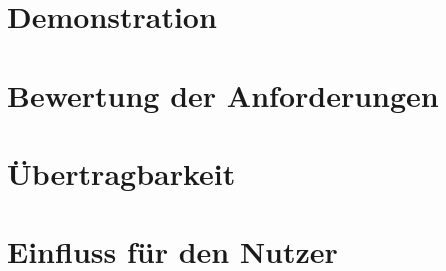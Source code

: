 
\section{Demonstration}
\label{sec:demonstration}


\section{Bewertung der Anforderungen}
\label{sec:bewertung-der-anforderungen}


\section{Übertragbarkeit}
\label{sec:uebertragbarkeit}


\section{Einfluss für den Nutzer}
\label{sec:einfluss-fuer-den-nutzer}
